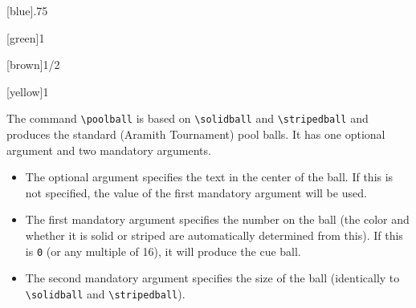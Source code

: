 \documentclass{article}
\begin{document}
{\begin{tcolorbox}[blanker,sidebyside,before skip=10pt,after skip=10pt]
\begin{verbbox}[righthand width=1.3cm]
\end{verbbox}
\begin{verbbox}[righthand width=1.3cm]
\end{verbbox}
\begin{verbbox}[righthand width=1.3cm]
[blue]{.75}
\end{verbbox}
\begin{verbbox}[righthand width=1.3cm]
[green]{1}
\end{verbbox}
\tcblower %
\begin{verbbox}[righthand width=1.3cm]
\end{verbbox}
\begin{verbbox}[righthand width=1.3cm]
[brown]{1/2}
\end{verbbox}
\begin{verbbox}[righthand width=1.3cm]
\end{verbbox}
\begin{verbbox}[righthand width=1.3cm]
[yellow]{1}
\end{verbbox}
\end{tcolorbox}

\newpage %

The command \verb!\poolball! is based on \verb!\solidball! and \verb!\stripedball! and produces the standard (Aramith Tournament) pool balls. It has one optional argument and two mandatory arguments.
\begin{itemize}
    \item The optional argument specifies the text in the center of the ball. If this is not specified, the value of the first mandatory argument will be used.
    \item The first mandatory argument specifies the number on the ball (the color and whether it is solid or striped are automatically determined from this). If this is \texttt{0} (or any multiple of 16), it will produce the cue ball.
    \item The second mandatory argument specifies the size of the ball (identically to \verb!\solidball! and \verb!\stripedball!).
\end{itemize}

}
\end{document}
